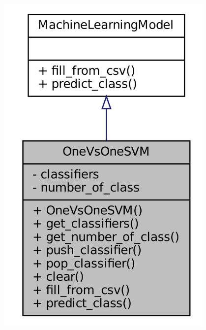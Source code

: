 \documentclass[10pt]{article}
\begin{document}
\begin{minipage}[t]{0.4\linewidth}
\centering
\vspace{-2ex}
\includegraphics[width=0.8\textwidth]{SVMDiagram.png}
\end{minipage}
\end{document}
